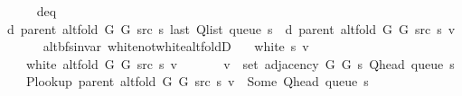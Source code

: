 \begin{isabellebody}
\ \ \ \ \isamarkupfalse%
\ d{\isacharunderscore}{\kern0pt}eq\isanewline
\ \ \ \ \isacommand{{\isachardot}{\kern0pt}{\isachardot}{\kern0pt}}\isamarkupfalse%
\isanewline
\ \ \isamarkupfalse%
\ \isamarkupfalse%
\ {\isachardoublequoteopen}d\ {\isacharparenleft}{\kern0pt}parent\ {\isacharparenleft}{\kern0pt}alt{\isacharunderscore}{\kern0pt}fold\ G{}\ G{}\ src\ s{\isacharparenright}{\kern0pt}{\isacharparenright}{\kern0pt}\ {\isacharparenleft}{\kern0pt}last\ {\isacharparenleft}{\kern0pt}Q{\isacharunderscore}{\kern0pt}list\ {\isacharparenleft}{\kern0pt}queue\ s{\isacharparenright}{\kern0pt}{\isacharparenright}{\kern0pt}{\isacharparenright}{\kern0pt}\ {\isasymle}\ d\ {\isacharparenleft}{\kern0pt}parent\ {\isacharparenleft}{\kern0pt}alt{\isacharunderscore}{\kern0pt}fold\ G{}\ G{}\ src\ s{\isacharparenright}{\kern0pt}{\isacharparenright}{\kern0pt}\ v{\isachardoublequoteclose}\isanewline
\ \ \ \ \isacommand{{\isachardot}{\kern0pt}}\isamarkupfalse%
\isanewline
{}\isamarkupfalse%
%
\endisatagproof
{\isafoldproof}%
%
\isadelimproof
\isanewline
%
\endisadelimproof
\isanewline
{}\isamarkupfalse%
\ {\isacharparenleft}{\kern0pt}\ alt{\isacharunderscore}{\kern0pt}bfs{\isacharunderscore}{\kern0pt}invar{\isacharparenright}{\kern0pt}\ white{\isacharunderscore}{\kern0pt}not{\isacharunderscore}{\kern0pt}white{\isacharunderscore}{\kern0pt}alt{\isacharunderscore}{\kern0pt}foldD{\isacharcolon}{\kern0pt}\isanewline
\ \ \ {\isachardoublequoteopen}white\ s\ v{\isachardoublequoteclose}\isanewline
\ \ \ {\isachardoublequoteopen}{\isasymnot}\ white\ {\isacharparenleft}{\kern0pt}alt{\isacharunderscore}{\kern0pt}fold\ G{}\ G{}\ src\ s{\isacharparenright}{\kern0pt}\ v{\isachardoublequoteclose}\isanewline
\ \ \isanewline
\ \ \ \ {\isachardoublequoteopen}v\ {\isasymin}\ set\ {\isacharparenleft}{\kern0pt}adjacency\ G{}\ G{}\ s\ {\isacharparenleft}{\kern0pt}Q{\isacharunderscore}{\kern0pt}head\ {\isacharparenleft}{\kern0pt}queue\ s{\isacharparenright}{\kern0pt}{\isacharparenright}{\kern0pt}{\isacharparenright}{\kern0pt}{\isachardoublequoteclose}\isanewline
\ \ \ \ {\isachardoublequoteopen}P{\isacharunderscore}{\kern0pt}lookup\ {\isacharparenleft}{\kern0pt}parent\ {\isacharparenleft}{\kern0pt}alt{\isacharunderscore}{\kern0pt}fold\ G{}\ G{}\ src\ s{\isacharparenright}{\kern0pt}{\isacharparenright}{\kern0pt}\ v\ {\isacharequal}{\kern0pt}\ Some\ {\isacharparenleft}{\kern0pt}Q{\isacharunderscore}{\kern0pt}head\ {\isacharparenleft}{\kern0pt}queue\ s{\isacharparenright}{\kern0pt}{\isacharparenright}{\kern0pt}{\isachardoublequoteclose}\isanewline

\end{isabellebody}
